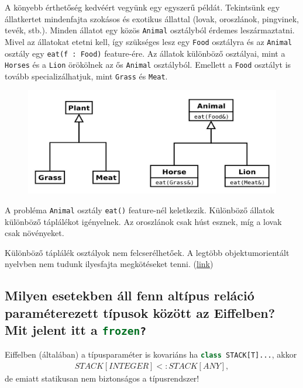 	A könyebb érthetőség kedvéért vegyünk egy egyszerű példát. Tekintsünk egy állatkertet mindenfajta szokásos és exotikus állattal (lovak, oroszlánok, pingvinek, tevék, stb.). Minden állatot egy közös \lstinline[language=Eiffel]|Animal| osztályból érdemes leszármaztatni. Mivel az állatokat etetni kell, így szükséges lesz egy \lstinline[language=Eiffel]|Food| osztályra és az \lstinline[language=Eiffel]|Animal| osztály egy \lstinline[language=Eiffel]|eat(f : Food)| feature-ére. Az állatok különböző osztályai, mint a \lstinline[language=Eiffel]|Horses| és a \lstinline[language=Eiffel]|Lion| örökölnek az ős \lstinline[language=Eiffel]|Animal| osztályból. Emellett a \lstinline[language=Eiffel]|Food| osztályt is tovább specializálhatjuk, mint \lstinline[language=Eiffel]|Grass| és \lstinline[language=Eiffel]|Meat|.
	\begin{figure}[H]
		\centering
		\includegraphics[width=0.7\linewidth]{familyPolymorphism}
		\label{fig:familypolymorhism}
	\end{figure}
	
	
	
	A probléma \lstinline[language=Eiffel]|Animal| osztály \lstinline[language=Eiffel]|eat()| feature-nél keletkezik. Különböző állatok különböző táplálékot igényelnek. Az oroszlánok csak húst esznek, míg a lovak csak növényeket.
	
	Különböző táplálék osztályok nem felcserélhetőek. A legtöbb objektumorientált nyelvben nem tudunk ilyesfajta megkötéseket tenni. (\href{http://icai.ektf.hu/pdf/ICAI2004-vol2-pp445-453.pdf}{link})
	
\subsection{ Milyen esetekben áll fenn altípus reláció paraméterezett típusok között az Eiffelben? Mit jelent itt a \lstinline[language=Eiffel]|frozen?|}
	Eiffelben (általában) a típusparaméter is kovariáns ha \lstinline[language=Eiffel]|class STACK[T]...|, akkor
	\begin{align*}
		STACK[INTEGER] <: STACK[ANY],
	\end{align*} de emiatt statikusan nem biztonságos a típusrendszer!

